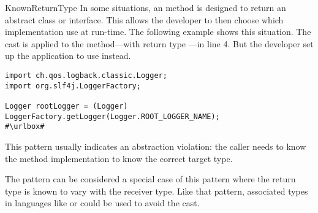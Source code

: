 \begin{pattern}{KnownReturnType}
In some situations,
an \api{} method is designed to return an abstract class or interface.
This \api{} allows the developer to then choose which implementation use at run-time.
The following example shows this situation.
The cast is applied to the  method---with return type ---in line 4.
But the developer set up the application to use  instead.

\def\urlvar{http://bit.ly/skylot_jadx_2HIoR9X}
\begin{verbatim}
import ch.qos.logback.classic.Logger;
import org.slf4j.LoggerFactory;

Logger rootLogger = (Logger) LoggerFactory.getLogger(Logger.ROOT_LOGGER_NAME);
#\urlbox#
\end{verbatim}


\issues{}
This pattern usually indicates an abstraction violation:
the caller needs to know the method implementation to know the correct target type.

The  pattern can be considered a special case of this pattern where the return type is known to vary with the receiver type.
Like that pattern,
associated types~\citep{chakravartyAssociatedTypeSynonyms2005}
in languages like \haskell{} or \rust{} could be used to avoid the cast.

\end{pattern}